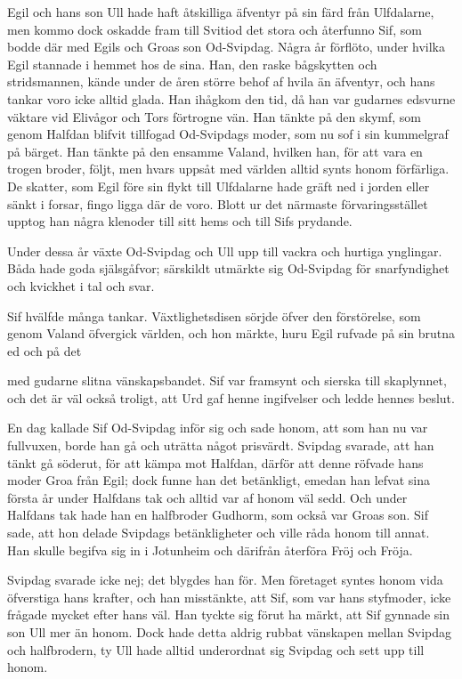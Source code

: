 
Egil och hans son Ull hade haft åtskilliga äfventyr på sin färd från
Ulfdalarne, men kommo dock oskadde fram till Svitiod det stora och
återfunno Sif, som bodde där med Egils och Groas son Od-Svipdag. Några
år förflöto, under hvilka Egil stannade i hemmet hos de sina. Han, den
raske bågskytten och stridsmannen, kände under de åren större behof af
hvila än äfventyr, och hans tankar voro icke alltid glada. Han ihågkom
den tid, då han var gudarnes edsvurne väktare vid Elivågor och Tors
förtrogne vän. Han tänkte på den skymf, som genom Halfdan blifvit
tillfogad Od-Svipdags moder, som nu sof i sin kummelgraf på bärget. Han
tänkte på den ensamme Valand, hvilken han, för att vara en trogen
broder, följt, men hvars uppsåt med världen alltid synts honom
förfärliga. De skatter, som Egil före sin flykt till Ulfdalarne hade
gräft ned i jorden eller sänkt i forsar, fingo ligga där de voro. Blott
ur det närmaste förvaringsstället upptog han några klenoder till sitt
hems och till Sifs prydande.

Under dessa år växte Od-Svipdag och Ull upp till vackra och hurtiga
ynglingar. Båda hade goda själsgåfvor; särskildt utmärkte sig Od-Svipdag
för snarfyndighet och kvickhet i tal och svar.

Sif hvälfde många tankar. Växtlighetsdisen sörjde öfver den förstörelse,
som genom Valand öfvergick världen, och hon märkte, huru Egil rufvade på
sin brutna ed och på det

med gudarne slitna vänskapsbandet. Sif var framsynt och sierska till
skaplynnet, och det är väl också troligt, att Urd gaf henne ingifvelser
och ledde hennes beslut.

En dag kallade Sif Od-Svipdag inför sig och sade honom, att som han nu
var fullvuxen, borde han gå och uträtta något prisvärdt. Svipdag
svarade, att han tänkt gå söderut, för att kämpa mot Halfdan, därför att
denne röfvade hans moder Groa från Egil; dock funne han det betänkligt,
emedan han lefvat sina första år under Halfdans tak och alltid var af
honom väl sedd. Och under Halfdans tak hade han en halfbroder Gudhorm,
som också var Groas son. Sif sade, att hon delade Svipdags
betänkligheter och ville råda honom till annat. Han skulle begifva sig
in i Jotunheim och därifrån återföra Fröj och Fröja.

Svipdag svarade icke nej; det blygdes han för. Men företaget syntes
honom vida öfverstiga hans krafter, och han misstänkte, att Sif, som var
hans styfmoder, icke frågade mycket efter hans väl. Han tyckte sig förut
ha märkt, att Sif gynnade sin son Ull mer än honom. Dock hade detta
aldrig rubbat vänskapen mellan Svipdag och halfbrodern, ty Ull hade
alltid underordnat sig Svipdag och sett upp till honom.

